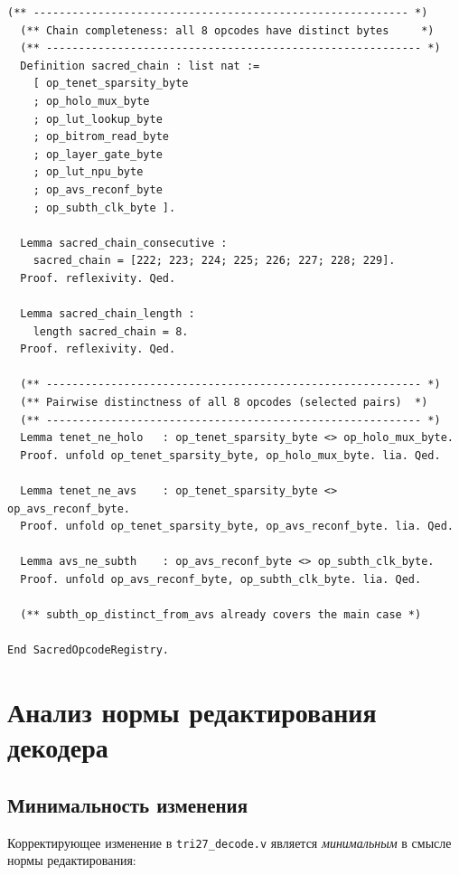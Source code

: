 \begin{lstlisting}[language=Coq,
  caption={Полный модуль SubThreshold.v (ICA-W38-001,
    PR~\#661~\cite{pr661_t27})},
  label={lst:full_coq}]
  (** ---------------------------------------------------------- *)
  (** Chain completeness: all 8 opcodes have distinct bytes     *)
  (** ---------------------------------------------------------- *)
  Definition sacred_chain : list nat :=
    [ op_tenet_sparsity_byte
    ; op_holo_mux_byte
    ; op_lut_lookup_byte
    ; op_bitrom_read_byte
    ; op_layer_gate_byte
    ; op_lut_npu_byte
    ; op_avs_reconf_byte
    ; op_subth_clk_byte ].

  Lemma sacred_chain_consecutive :
    sacred_chain = [222; 223; 224; 225; 226; 227; 228; 229].
  Proof. reflexivity. Qed.

  Lemma sacred_chain_length :
    length sacred_chain = 8.
  Proof. reflexivity. Qed.

  (** ---------------------------------------------------------- *)
  (** Pairwise distinctness of all 8 opcodes (selected pairs)  *)
  (** ---------------------------------------------------------- *)
  Lemma tenet_ne_holo   : op_tenet_sparsity_byte <> op_holo_mux_byte.
  Proof. unfold op_tenet_sparsity_byte, op_holo_mux_byte. lia. Qed.

  Lemma tenet_ne_avs    : op_tenet_sparsity_byte <> op_avs_reconf_byte.
  Proof. unfold op_tenet_sparsity_byte, op_avs_reconf_byte. lia. Qed.

  Lemma avs_ne_subth    : op_avs_reconf_byte <> op_subth_clk_byte.
  Proof. unfold op_avs_reconf_byte, op_subth_clk_byte. lia. Qed.

  (** subth_op_distinct_from_avs already covers the main case *)

End SacredOpcodeRegistry.
\end{lstlisting}

\section{Анализ нормы редактирования декодера}
\label{app:decoder_edit_norm}

\subsection{Минимальность изменения}

Корректирующее изменение в \texttt{tri27\_decode.v} является
\emph{минимальным} в смысле нормы редактирования:

